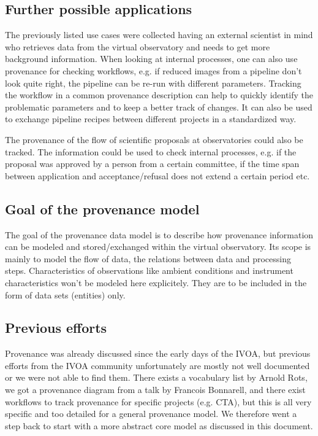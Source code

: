 \documentclass[11pt,a4paper]{ivoa}
\begin{document}
\subsection{Further possible applications}
The previously listed use cases were collected having an external scientist in mind who retrieves data from the virtual observatory and needs to get more background information. When looking at internal processes, one can also use provenance for checking workflows, e.g. if reduced images from a pipeline don't look quite right, the pipeline can be re-run with different parameters. Tracking the workflow in a common provenance description can help to quickly identify the problematic parameters and to keep a better track of changes. It can also be used to exchange pipeline recipes between different projects in a standardized way.

The provenance of the flow of scientific proposals at observatories could also be tracked. The information could be used to check internal processes, e.g. if the proposal was approved by a person from a certain committee, if the time span between application and acceptance/refusal does not extend a certain period etc. 


\subsection{Goal of the provenance model}
The goal of the provenance data model is to describe how provenance information can be modeled and stored/exchanged within the virtual observatory. Its scope is mainly to model the flow of data, the relations between data and processing steps. Characteristics of observations like ambient conditions and instrument characteristics won't be modeled here explicitely. They are to be included in the form of data sets (entities) only.


\subsection{Previous efforts}
Provenance was already discussed since the early days of the IVOA, but previous efforts from the IVOA community unfortunately are mostly not well documented or we were not able to find them. 
There exists a vocabulary list by Arnold Rots, we got a provenance diagram from a talk by Francois Bonnarell, and there exist workflows to track provenance for specific projects (e.g. CTA), but this is all very specific and too detailed for a general provenance model. We therefore went a step back to start with a more abstract core model as discussed in this document.
\end{document}

